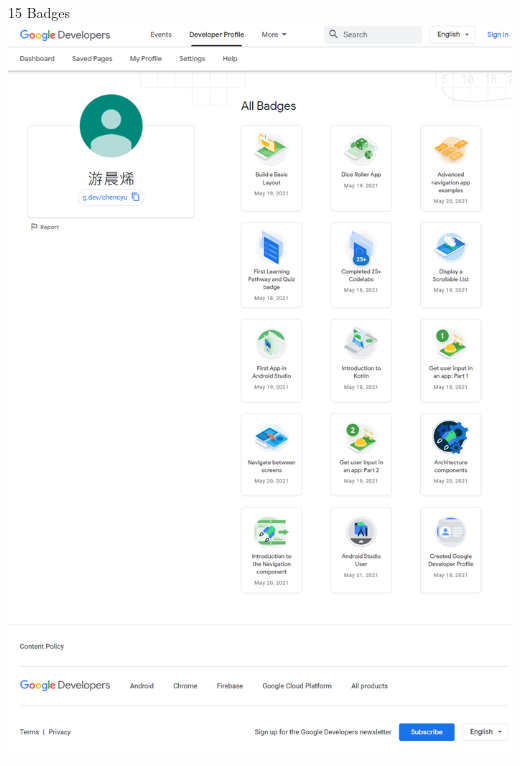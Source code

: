 

\begin{cventries}

  \cventry
    {15 Badges\linebreak[1]\includegraphics[scale=0.2, left]{android.png}}
    {\href{https://g.dev/chencyu}{\color{hyperlink}{Android Study Jam 2021(link)}}}
    {}{}{}


\end{cventries}
